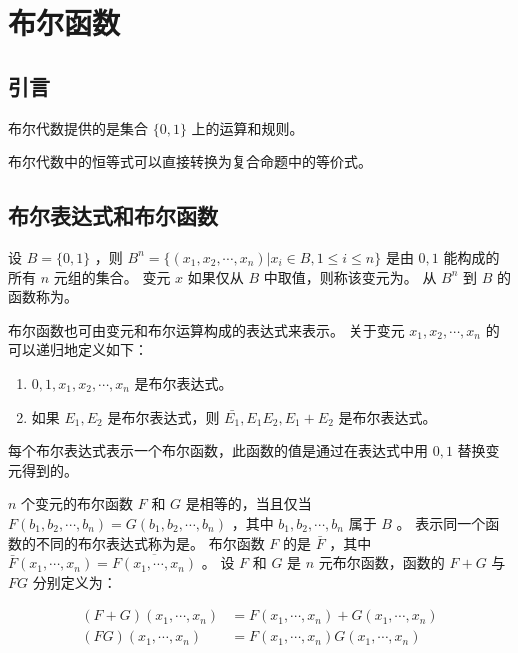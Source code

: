 
\section{布尔函数}
{
    \subsection{引言}
    {
        布尔代数提供的是集合 $\{0, 1\}$ 上的运算和规则。

        布尔代数中的恒等式可以直接转换为复合命题中的等价式。
    }

    \subsection{布尔表达式和布尔函数}
    {
        设 $B = \{0, 1\}$ ，则 $B^n = \{(x_1, x_2, \cdots, x_n) | x_i \in B, 1 \leq i \leq n\}$ 是由 $0, 1$ 能构成的所有 $n$ 元组的集合。
        变元 $x$ 如果仅从 $B$ 中取值，则称该变元为。
        从 $B^n$ 到 $B$ 的函数称为。

        布尔函数也可由变元和布尔运算构成的表达式来表示。
        关于变元 $x_1, x_2, \cdots, x_n$ 的可以递归地定义如下：

        \begin{enumerate}
            \item $0, 1, x_1, x_2, \cdots, x_n$ 是布尔表达式。
            \item 如果 $E_1, E_2$ 是布尔表达式，则 $\bar{E_1}, E_1E_2, E_1 + E_2$ 是布尔表达式。
        \end{enumerate}

        每个布尔表达式表示一个布尔函数，此函数的值是通过在表达式中用 $0, 1$ 替换变元得到的。

        $n$ 个变元的布尔函数 $F$ 和 $G$ 是相等的，当且仅当 $F(b_1, b_2, \cdots, b_n) = G(b_1, b_2, \cdots, b_n)$ ，其中 $b_1, b_2, \cdots, b_n$ 属于 $B$ 。
        表示同一个函数的不同的布尔表达式称为是。
        布尔函数 $F$ 的是 $\bar{F}$ ，其中 $\bar{F}(x_1, \cdots, x_n) = \overline{F(x_1, \cdots, x_n)}$ 。
        设 $F$ 和 $G$ 是 $n$ 元布尔函数，函数的 $F + G$ 与 $FG$ 分别定义为：

        \begin{align*}
            (F + G)(x_1, \cdots, x_n) &= F(x_1, \cdots, x_n) + G(x_1, \cdots, x_n) \\
            (FG)(x_1, \cdots, x_n) &= F(x_1, \cdots, x_n)G(x_1, \cdots, x_n)
        \end{align*}

}}
